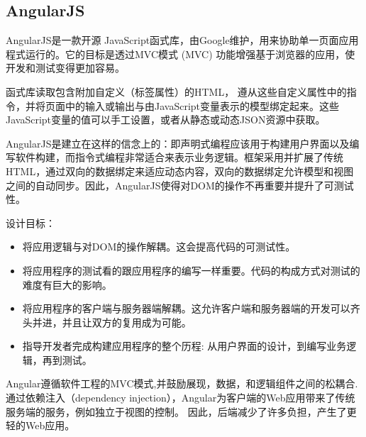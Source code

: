 \subsection{AngularJS}
AngularJS是一款开源 JavaScript函式库，由Google维护，用来协助单一页面应用程式运行的。它的目标是透过MVC模式 (MVC) 功能增强基于浏览器的应用，使开发和测试变得更加容易。

函式库读取包含附加自定义（标签属性）的HTML， 遵从这些自定义属性中的指令，并将页面中的输入或输出与由JavaScript变量表示的模型绑定起来。这些JavaScript变量的值可以手工设置，或者从静态或动态JSON资源中获取。

AngularJS是建立在这样的信念上的：即声明式编程应该用于构建用户界面以及编写软件构建，而指令式编程非常适合来表示业务逻辑。框架采用并扩展了传统HTML，通过双向的数据绑定来适应动态内容，双向的数据绑定允许模型和视图之间的自动同步。因此，AngularJS使得对DOM的操作不再重要并提升了可测试性。

设计目标：
\begin{itemize}
	\item 将应用逻辑与对DOM的操作解耦。这会提高代码的可测试性。
	\item 将应用程序的测试看的跟应用程序的编写一样重要。代码的构成方式对测试的难度有巨大的影响。
	\item 将应用程序的客户端与服务器端解耦。这允许客户端和服务器端的开发可以齐头并进，并且让双方的复用成为可能。
	\item 指导开发者完成构建应用程序的整个历程: 从用户界面的设计，到编写业务逻辑，再到测试。
\end{itemize}

Angular遵循软件工程的MVC模式,并鼓励展现，数据，和逻辑组件之间的松耦合.通过依赖注入（dependency injection），Angular为客户端的Web应用带来了传统服务端的服务，例如独立于视图的控制。 因此，后端减少了许多负担，产生了更轻的Web应用。